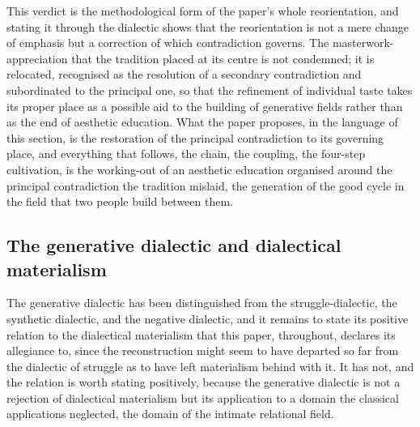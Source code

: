 
This verdict is the methodological form of the paper's whole reorientation, and stating it through the dialectic shows that the reorientation is not a mere change of emphasis but a correction of which contradiction governs. The masterwork-appreciation that the tradition placed at its centre is not condemned; it is relocated, recognised as the resolution of a secondary contradiction and subordinated to the principal one, so that the refinement of individual taste takes its proper place as a possible aid to the building of generative fields rather than as the end of aesthetic education. What the paper proposes, in the language of this section, is the restoration of the principal contradiction to its governing place, and everything that follows, the chain, the coupling, the four-step cultivation, is the working-out of an aesthetic education organised around the principal contradiction the tradition mislaid, the generation of the good cycle in the field that two people build between them.

\subsection{The generative dialectic and dialectical materialism}
\label{p22:sub:method-materialism}

The generative dialectic has been distinguished from the struggle-dialectic, the synthetic dialectic, and the negative dialectic, and it remains to state its positive relation to the dialectical materialism that this paper, throughout, declares its allegiance to, since the reconstruction might seem to have departed so far from the dialectic of struggle as to have left materialism behind with it. It has not, and the relation is worth stating positively, because the generative dialectic is not a rejection of dialectical materialism but its application to a domain the classical applications neglected, the domain of the intimate relational field.

